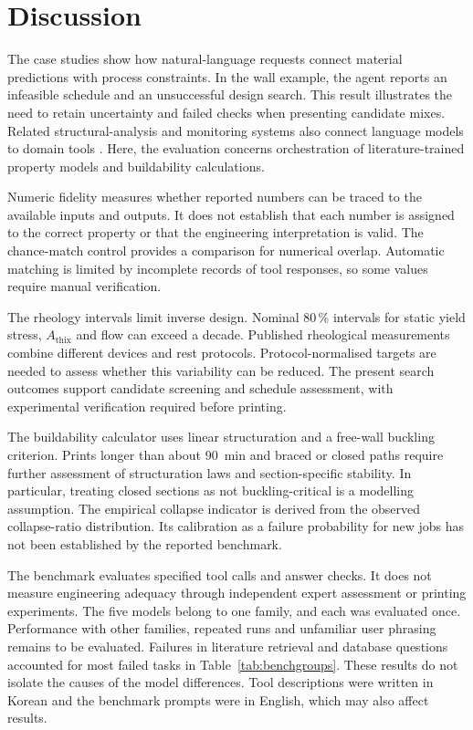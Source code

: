\documentclass[preprint,12pt]{elsarticle}
\begin{document}
\section{Discussion}\label{sec:discussion}

The case studies show how natural-language requests connect material predictions with process constraints. In the wall example, the agent reports an infeasible schedule and an unsuccessful design search. This result illustrates the need to retain uncertainty and failed checks when presenting candidate mixes. Related structural-analysis and monitoring systems also connect language models to domain tools \cite{liu2026llm4shm,avila2025hai}. Here, the evaluation concerns orchestration of literature-trained property models and buildability calculations.

Numeric fidelity measures whether reported numbers can be traced to the available inputs and outputs. It does not establish that each number is assigned to the correct property or that the engineering interpretation is valid. The chance-match control provides a comparison for numerical overlap. Automatic matching is limited by incomplete records of tool responses, so some values require manual verification.

The rheology intervals limit inverse design. Nominal 80\,\% intervals for static yield stress, $A_{\mathrm{thix}}$ and flow can exceed a decade. Published rheological measurements combine different devices and rest protocols. Protocol-normalised targets are needed to assess whether this variability can be reduced. The present search outcomes support candidate screening and schedule assessment, with experimental verification required before printing.

The buildability calculator uses linear structuration and a free-wall buckling criterion. Prints longer than about 90~min and braced or closed paths require further assessment of structuration laws and section-specific stability. In particular, treating closed sections as not buckling-critical is a modelling assumption. The empirical collapse indicator is derived from the observed collapse-ratio distribution. Its calibration as a failure probability for new jobs has not been established by the reported benchmark.

The benchmark evaluates specified tool calls and answer checks. It does not measure engineering adequacy through independent expert assessment or printing experiments. The five models belong to one family, and each was evaluated once. Performance with other families, repeated runs and unfamiliar user phrasing remains to be evaluated. Failures in literature retrieval and database questions accounted for most failed tasks in Table~\ref{tab:benchgroups}. These results do not isolate the causes of the model differences. Tool descriptions were written in Korean and the benchmark prompts were in English, which may also affect results.
\end{document}
